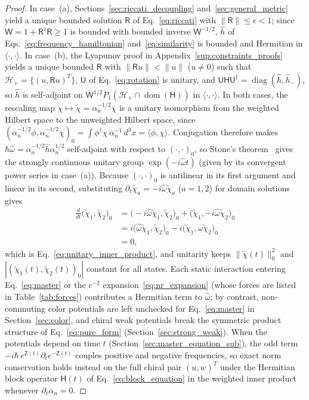 \documentclass[aps,prd,onecolumn,tightenlines,nofootinbib,notitlepage,11pt,floatfix]{revtex4-2}
\theoremstyle{indentedtheorem}
\begin{document}
\begin{proof}
In case~(a), Sections~\ref{sec:riccati_decoupling} and~\ref{sec:general_metric} yield a unique bounded solution $\mathsf{R}$ of Eq.~\eqref{eq:riccati} with $\|\mathsf{R}\|\le\epsilon<1$; since $\mathsf{W}=1+\mathsf{R}^\dagger\mathsf{R}\ge 1$ is bounded with bounded inverse $\mathsf{W}^{-1/2}$, $\hat{h}$ of Eqs.~\eqref{eq:frequency_hamiltonian} and~\eqref{eq:similarity} is bounded and Hermitian in $\langle\cdot,\cdot\rangle$. In case~(b), the Lyapunov proof in Appendix~\ref{sup:constraints_proofs} yields a unique bounded $\mathsf{R}$ with $\|\mathsf{R}u\|<\|u\|$ ($u\neq 0$) such that $\mathcal{H}_+=\{(u,\mathsf{R}u)^T\}$, $\mathsf{U}$ of Eq.~\eqref{eq:rotation} is unitary, and $\mathsf{U}\mathsf{H}\mathsf{U}^\dagger = \operatorname{diag}(\hat{h},\hat{h}_-)$, so $\hat{h}$ is self-adjoint on $\mathsf{W}^{1/2}P_1(\mathcal{H}_+\cap\operatorname{dom}(\mathsf{H}))$ in $\langle\cdot,\cdot\rangle$. In both cases, the rescaling map $\chi\mapsto\tilde{\chi}=\alpha_n^{-1/2}\chi$ is a unitary isomorphism from the weighted Hilbert space to the unweighted Hilbert space, since $(\alpha_n^{-1/2}\phi,\alpha_n^{-1/2}\chi)_0 = \int\phi^\dagger\chi\,\alpha_n^{-1}\,d^3x = \langle\phi,\chi\rangle$. Conjugation therefore makes $\hbar\hat{\omega}=\alpha_n^{-1/2}\hat{h}\alpha_n^{1/2}$ self-adjoint with respect to $(\cdot,\cdot)_0$, so Stone's theorem~\citep{Stone1932} gives the strongly continuous unitary group $\exp(-i\hat{\omega}t)$ (given by its convergent power series in case~(a)). Because $(\cdot,\cdot)_0$ is antilinear in its first argument and linear in its second, substituting $\partial_t\tilde{\chi}_a = -i\hat{\omega}\tilde{\chi}_a$ ($a=1,2$) for domain solutions gives
\begin{align*}
    \frac{d}{dt}\big(\tilde{\chi}_1,\tilde{\chi}_2\big)_0 &= \big(-i\hat{\omega}\tilde{\chi}_1,\tilde{\chi}_2\big)_0 + \big(\tilde{\chi}_1,-i\hat{\omega}\tilde{\chi}_2\big)_0 \\
    &= i\big(\hat{\omega}\tilde{\chi}_1,\tilde{\chi}_2\big)_0 - i\big(\tilde{\chi}_1,\hat{\omega}\tilde{\chi}_2\big)_0 \\
    &= 0 ,
\end{align*}
which is Eq.~\eqref{eq:unitary_inner_product}, and unitarity keeps $\|\tilde{\chi}(t)\|_0^2$ and $|(\tilde{\chi}_1(t),\tilde{\chi}_2(t))_0|$ constant for all states. Each static interaction entering Eq.~\eqref{eq:master} or the $c^{-2}$ expansion~\eqref{eq:nr_expansion} (whose forces are listed in Table~\ref{tab:forces}) contributes a Hermitian term to $\hat{\omega}$; by contrast, non-commuting color potentials are left unchecked for Eq.~\eqref{eq:master} in Section~\ref{sec:color}, and chiral weak potentials break the symmetric product structure of Eq.~\eqref{eq:pure_form} (Section~\ref{sec:strong_weak}). When the potentials depend on time $t$ (Section~\ref{sec:master_equation_sub}), the odd term $-i\hbar\,e^{\mathsf{Z}(t)}\partial_t e^{-\mathsf{Z}(t)}$ couples positive and negative frequencies, so exact norm conservation holds instead on the full chiral pair $(u,w)^T$ under the Hermitian block operator $\mathsf{H}(t)$ of Eq.~\eqref{eq:block_equation} in the weighted inner product whenever $\partial_t\alpha_n=0$.
\end{proof}
\end{document}
